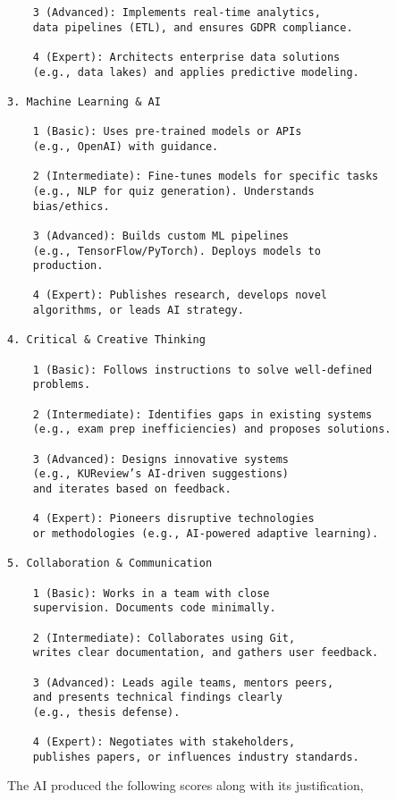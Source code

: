 \begin{verbatim}
    3 (Advanced): Implements real-time analytics,
    data pipelines (ETL), and ensures GDPR compliance.

    4 (Expert): Architects enterprise data solutions
    (e.g., data lakes) and applies predictive modeling.

3. Machine Learning & AI

    1 (Basic): Uses pre-trained models or APIs
    (e.g., OpenAI) with guidance.

    2 (Intermediate): Fine-tunes models for specific tasks
    (e.g., NLP for quiz generation). Understands
    bias/ethics.

    3 (Advanced): Builds custom ML pipelines
    (e.g., TensorFlow/PyTorch). Deploys models to
    production.

    4 (Expert): Publishes research, develops novel
    algorithms, or leads AI strategy.

4. Critical & Creative Thinking

    1 (Basic): Follows instructions to solve well-defined
    problems.

    2 (Intermediate): Identifies gaps in existing systems
    (e.g., exam prep inefficiencies) and proposes solutions.

    3 (Advanced): Designs innovative systems
    (e.g., KUReview’s AI-driven suggestions)
    and iterates based on feedback.

    4 (Expert): Pioneers disruptive technologies
    or methodologies (e.g., AI-powered adaptive learning).

5. Collaboration & Communication

    1 (Basic): Works in a team with close
    supervision. Documents code minimally.

    2 (Intermediate): Collaborates using Git,
    writes clear documentation, and gathers user feedback.

    3 (Advanced): Leads agile teams, mentors peers,
    and presents technical findings clearly
    (e.g., thesis defense).

    4 (Expert): Negotiates with stakeholders,
    publishes papers, or influences industry standards.
\end{verbatim}

The AI produced the following scores along with its justification,


